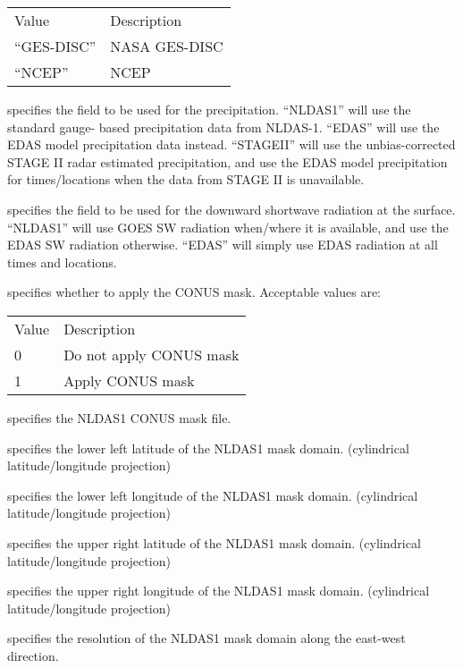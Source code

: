  \begin{tabular}{ll}
 Value & Description   \\
 ``GES-DISC'' & NASA GES-DISC \\
 ``NCEP''     & NCEP          \\
 \end{tabular}

  specifies the field to be used
 for the precipitation.  ``NLDAS1'' will use the standard gauge-
 based precipitation data from NLDAS-1.  ``EDAS'' will use the
 EDAS model precipitation data instead.  ``STAGEII'' will use the
 unbias-corrected STAGE II radar estimated precipitation, and use
 the EDAS model precipitation for times/locations when the data
 from STAGE II is unavailable.

  specifies the field to be
 used for the downward shortwave radiation at the surface.  ``NLDAS1''
 will use GOES SW radiation when/where it is available, and use the
 EDAS SW radiation otherwise.  ``EDAS'' will simply use EDAS radiation
 at all times and locations.

  specifies whether to apply the
 CONUS mask.
 Acceptable values are:

 \begin{tabular}{ll}
 Value & Description             \\
 0     & Do not apply CONUS mask \\
 1     & Apply CONUS mask        \\
 \end{tabular}

  specifies the NLDAS1 CONUS mask file.

  specifies the lower left latitude
 of the NLDAS1 mask domain. (cylindrical latitude/longitude projection)

  specifies the lower left longitude
 of the NLDAS1 mask domain. (cylindrical latitude/longitude projection)

  specifies the upper right latitude
 of the NLDAS1 mask domain. (cylindrical latitude/longitude projection)

  specifies the upper right longitude
 of the NLDAS1 mask domain. (cylindrical latitude/longitude projection)

  specifies the resolution of the 
 NLDAS1 mask domain along the east-west direction.

